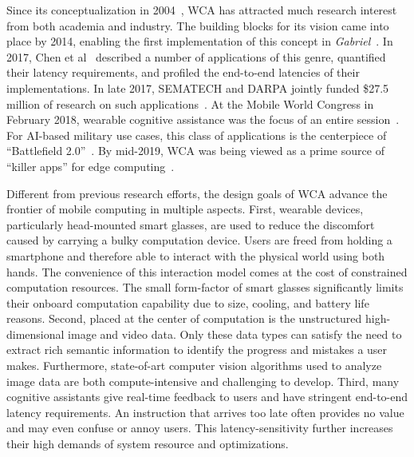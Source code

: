 Since its conceptualization in 2004~\cite{Satya2004}, WCA has attracted much
research interest from both academia and industry. The building blocks for its
vision came into place by 2014, enabling the first implementation of this
concept in {\em Gabriel}~\cite{ha2014towards}. In 2017, Chen et
al~\cite{chen2017empirical} described a number of applications of this genre,
quantified their latency requirements, and profiled the end-to-end latencies of
their implementations. In late 2017, SEMATECH and DARPA jointly funded \$27.5
million of research on such applications~\cite{Oakley2018, Stokes2018}.  At the
Mobile World Congress in February 2018, wearable cognitive assistance was the
focus of an entire session~\cite{Ray2018}.  For AI-based military use cases,
this class of applications is the centerpiece of ``Battlefield
2.0''~\cite{Doffman2018}. By mid-2019, WCA was being viewed as a prime source of
``killer apps'' for edge computing~\cite{Satya2019b,Satya2019c}.


Different from previous research efforts, the design goals of WCA advance the
frontier of mobile computing in multiple aspects. First, wearable devices,
particularly head-mounted smart glasses, are used to reduce the discomfort
caused by carrying a bulky computation device. Users are freed from holding a
smartphone and therefore able to interact with the physical world using both
hands. The convenience of this interaction model comes at the cost of
constrained computation resources. The small form-factor of smart glasses
significantly limits their onboard computation capability due to size, cooling,
and battery life reasons. Second, placed at the center of computation is the
unstructured high-dimensional image and video data. Only these data types can
satisfy the need to extract rich semantic information to identify the progress
and mistakes a user makes. Furthermore, state-of-art computer vision algorithms
used to analyze image data are both compute-intensive and challenging to
develop. Third, many cognitive assistants give real-time feedback to users and
have stringent end-to-end latency requirements. An instruction that arrives too
late often provides no value and may even confuse or annoy users. This
latency-sensitivity further increases their high demands of system resource and
optimizations.


